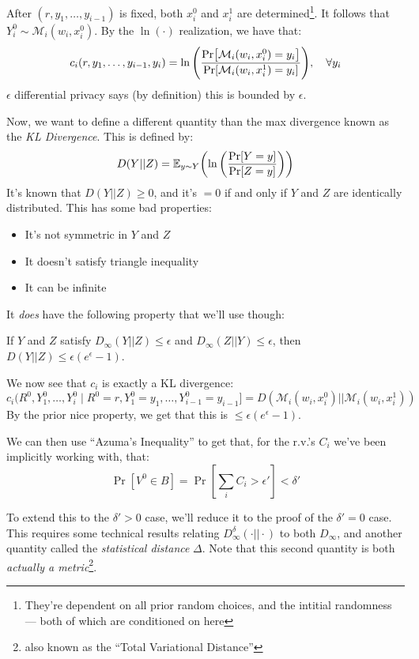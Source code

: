 \documentclass{article}
\theoremstyle{definition}
\begin{document}
After $(r,y_1,\dots,y_{i-1})$ is fixed, both $x_i^0$ and $x_i^1$ are determined\footnote{They're dependent on all prior random choices, and the intitial randomness --- both of which are conditioned on here}.
It follows that $Y_i^0\sim \mathcal{M}_i(w_i,x_i^0)$.
By the $\ln(\cdot)$ realization, we have that:
\begin{equation}
c_i(r,y_1,\dots,y_{i-1},y_i) = \ln\pqty{\frac{\Pr[\mathcal{M}_i(w_i,x_i^0) = y_i]}{\Pr[\mathcal{M}_i(w_i,x_i^1) = y_i]}},\quad \forall y_i
\end{equation}
$\epsilon$ differential privacy says (by definition) this is bounded by $\epsilon$.

Now, we want to define a different quantity than the max divergence known as the \emph{KL Divergence}.
This is defined by:
\begin{equation}
D(Y||Z) = \mathbb{E}_{y\sim Y}\pqty{\ln\pqty{\frac{\Pr[Y = y]}{\Pr[Z =y]}}}
\end{equation}
It's known that $D(Y||Z) \geq 0$, and it's $= 0$ if and only if $Y$ and $Z$ are identically distributed.
This has some bad properties:
\begin{itemize}
\item It's not symmetric in $Y$ and $Z$
\item It doesn't satisfy triangle inequality
\item It can be infinite
\end{itemize}
It \emph{does} have the following property that we'll use though:

If $Y$ and $Z$ satisfy $D_\infty(Y||Z)\leq \epsilon$ and $D_\infty(Z||Y) \leq \epsilon$, then $D(Y||Z) \leq \epsilon (e^\epsilon -1)$.

We now see that $c_i$ is exactly a KL divergence:
\begin{equation}
c_i(R^0,Y_1^0,\dots,Y_i^0\mid R^0=r,Y_1^0 = y_1,\dots,Y_{i-1}^0 = y_{i-1}] = D(\mathcal{M}_i(w_i,x_i^0)||\mathcal{M}_i(w_i,x_i^1))
\end{equation}
By the prior nice property, we get that this is $\leq \epsilon(e^\epsilon -1)$.

We can then use ``Azuma's Inequality'' to get that, for the r.v.'s $C_i$ we've been implicitly working with, that:
\begin{equation}
\Pr[V^0\in B] = \Pr[\sum_i C_i > \epsilon'] < \delta'
\end{equation}

To extend this to the $\delta' > 0$ case, we'll reduce it to the proof of the $\delta' = 0$ case.
This requires some technical results relating $D^\delta_\infty(\cdot||\cdot)$ to both $D_\infty$, and another quantity called the \emph{statistical distance} $\Delta$.
Note that this second quantity is both \emph{actually a metric}\footnote{also known as the ``Total Variational Distance''}.
\end{document}
